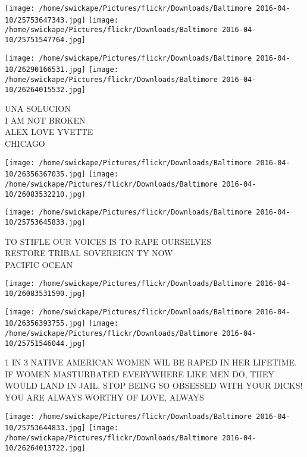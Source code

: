 \documentclass[10pt,letterpaper]{article}
\begin{document}
\texttt{[image: /home/swickape/Pictures/flickr/Downloads/Baltimore 2016-04-10/25753647343.jpg]}
\texttt{[image: /home/swickape/Pictures/flickr/Downloads/Baltimore 2016-04-10/25751547764.jpg]}

\texttt{[image: /home/swickape/Pictures/flickr/Downloads/Baltimore 2016-04-10/26290166531.jpg]}
\texttt{[image: /home/swickape/Pictures/flickr/Downloads/Baltimore 2016-04-10/26264015532.jpg]}

UNA SOLUCION\\
I AM NOT BROKEN\\
ALEX LOVE YVETTE\\
CHICAGO\\
\pagebreak

\texttt{[image: /home/swickape/Pictures/flickr/Downloads/Baltimore 2016-04-10/26356367035.jpg]}
\texttt{[image: /home/swickape/Pictures/flickr/Downloads/Baltimore 2016-04-10/26083532210.jpg]}

\texttt{[image: /home/swickape/Pictures/flickr/Downloads/Baltimore 2016-04-10/25753645833.jpg]}

TO STIFLE OUR VOICES IS TO RAPE OURSELVES\\
RESTORE TRIBAL SOVEREIGN TY NOW\\
PACIFIC OCEAN\\
\pagebreak

\texttt{[image: /home/swickape/Pictures/flickr/Downloads/Baltimore 2016-04-10/26083531590.jpg]}

\vspace{0.25in}
\texttt{[image: /home/swickape/Pictures/flickr/Downloads/Baltimore 2016-04-10/26356393755.jpg]}
\texttt{[image: /home/swickape/Pictures/flickr/Downloads/Baltimore 2016-04-10/25751546044.jpg]}

1 IN 3 NATIVE AMERICAN WOMEN WIL BE RAPED IN HER LIFETIME.\\
IF WOMEN MASTURBATED EVERYWHERE LIKE MEN DO, THEY WOULD LAND IN JAIL.  STOP BEING SO OBSESSED WITH YOUR DICKS!\\
YOU ARE ALWAYS WORTHY OF LOVE, ALWAYS\\
\pagebreak

\texttt{[image: /home/swickape/Pictures/flickr/Downloads/Baltimore 2016-04-10/25753644833.jpg]}
\texttt{[image: /home/swickape/Pictures/flickr/Downloads/Baltimore 2016-04-10/26264013722.jpg]}
\end{document}
